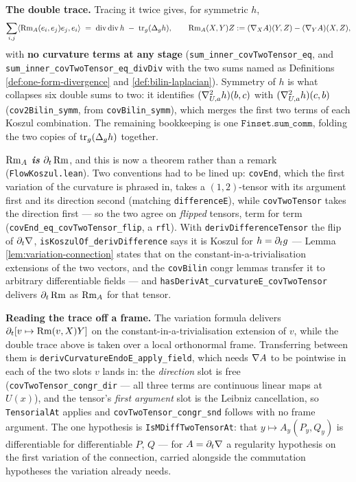 \begin{lemma}
  \textbf{The double trace.} Tracing it twice gives, for symmetric $h$,
  \[
    \sum_{i,j} \langle \operatorname{Rm}_A(e_i,e_j)e_j, e_i\rangle
      \;=\; \operatorname{div}\operatorname{div} h
        \;-\; \operatorname{tr}_g(\Delta_g h),
    \qquad
    \operatorname{Rm}_A(X,Y)Z := (\nabla_X A)(Y,Z) - (\nabla_Y A)(X,Z),
  \]
  with \textbf{no curvature terms at any stage}
  (\texttt{sum\_inner\_covTwoTensor\_eq}, and
  \texttt{sum\_inner\_covTwoTensor\_eq\_divDiv} with the two sums named as
  Definitions \ref{def:one-form-divergence} and \ref{def:bilin-laplacian}).
  Symmetry of $h$ is what collapses six double sums to two: it identifies
  $(\nabla^2_{U,a}h)(b,c)$ with $(\nabla^2_{U,a}h)(c,b)$
  (\texttt{cov2Bilin\_symm}, from \texttt{covBilin\_symm}), which merges the
  first two terms of each Koszul combination. The remaining bookkeeping is one
  $\texttt{Finset.sum\_comm}$, folding the two copies of
  $\operatorname{tr}_g(\Delta_g h)$ together.

  \textbf{$\operatorname{Rm}_A$ \emph{is} $\partial_t\operatorname{Rm}$}, and this is now a theorem rather
  than a remark (\texttt{FlowKoszul.lean}). Two conventions had to be lined up:
  \texttt{covEnd}, which the first variation of the curvature is phrased in,
  takes a $(1,2)$-tensor with its argument first and its direction second
  (matching \texttt{differenceE}), while \texttt{covTwoTensor} takes the
  direction first --- so the two agree on \emph{flipped} tensors, term for term
  (\texttt{covEnd\_eq\_covTwoTensor\_flip}, a \texttt{rfl}). With
  \texttt{derivDifferenceTensor} the flip of $\partial_t\nabla$,
  \texttt{isKoszulOf\_derivDifference} says it is Koszul for $h = \partial_t g$
  --- Lemma \ref{lem:variation-connection} states that on the
  constant-in-a-trivialisation extensions of the two vectors, and the
  \texttt{covBilin} congr lemmas transfer it to arbitrary differentiable fields
  --- and \texttt{hasDerivAt\_curvatureE\_covTwoTensor} delivers $\partial_t\operatorname{Rm}$
  as $\operatorname{Rm}_A$ for that tensor.

  \textbf{Reading the trace off a frame.} The variation formula delivers
  $\partial_t[v \mapsto \operatorname{Rm}(v,X)Y]$ on the constant-in-a-trivialisation
  extension of $v$, while the double trace above is taken over a local
  orthonormal frame. Transferring between them is
  \texttt{derivCurvatureEndoE\_apply\_field}, which needs $\nabla A$ to be
  pointwise in each of the two slots $v$ lands in: the \emph{direction} slot is
  free (\texttt{covTwoTensor\_congr\_dir} --- all three terms are continuous
  linear maps at $U(x)$), and the tensor's \emph{first argument} slot is the
  Leibniz cancellation, so \texttt{TensorialAt} applies and
  \texttt{covTwoTensor\_congr\_snd} follows with no frame argument. The one
  hypothesis is \texttt{IsMDiffTwoTensorAt}: that $y \mapsto A_y(P_y,Q_y)$ is
  differentiable for differentiable $P$, $Q$ --- for $A = \partial_t\nabla$ a
  regularity hypothesis on the first variation of the connection, carried
  alongside the commutation hypotheses the variation already needs.


\end{lemma}
